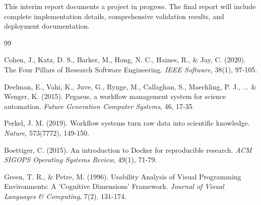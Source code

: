 \documentclass[12pt]{article}
\begin{document}
\hspace{\parindent}This interim report documents a project in progress. The final report will include complete implementation details, comprehensive validation results, and deployment documentation.

\newpage
\begin{thebibliography}{99}

Cohen, J., Katz, D. S., Barker, M., Hong, N. C., Haines, R., \& Jay, C. (2020). The Four Pillars of Research Software Engineering. \textit{IEEE Software}, 38(1), 97-105.

Deelman, E., Vahi, K., Juve, G., Rynge, M., Callaghan, S., Maechling, P. J., ... \& Wenger, K. (2015). Pegasus, a workflow management system for science automation. \textit{Future Generation Computer Systems}, 46, 17-35.

Perkel, J. M. (2019). Workflow systems turn raw data into scientific knowledge. \textit{Nature}, 573(7772), 149-150.

Boettiger, C. (2015). An introduction to Docker for reproducible research. \textit{ACM SIGOPS Operating Systems Review}, 49(1), 71-79.

Green, T. R., \& Petre, M. (1996). Usability Analysis of Visual Programming Environments: A 'Cognitive Dimensions' Framework. \textit{Journal of Visual Languages \& Computing}, 7(2), 131-174.

\end{thebibliography}
\end{document}
